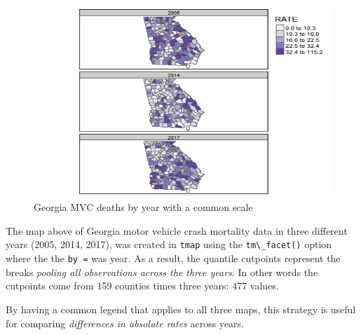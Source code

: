 \documentclass[
]{book}
\newcommand{\passthrough}[1]{#1}
\begin{document}
\begin{figure}
\centering
\includegraphics{images/time-series-ga-same-cuts.png}
\caption{\label{fig:unnamed-chunk-34}Georgia MVC deaths by year with a common scale}
\end{figure}

The map above of Georgia motor vehicle crash mortality data in three different years (2005, 2014, 2017), was created in \passthrough{\lstinline!tmap!} using the \passthrough{\lstinline!tm\_facet()!} option where the the \passthrough{\lstinline!by =!} was year. As a result, the quantile cutpoints represent the breaks \emph{pooling all observations across the three years}. In other words the cutpoints come from 159 counties times three years: 477 values.

By having a common legend that applies to all three maps, this strategy is useful for comparing \emph{differences in absolute rates} across years.
\end{document}
